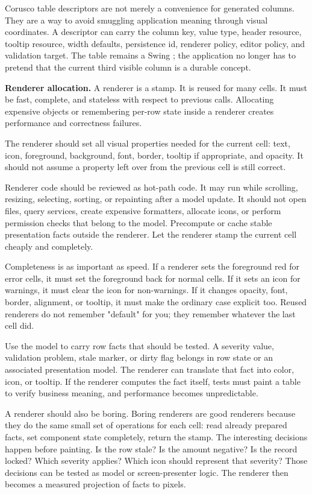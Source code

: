 Corusco table descriptors are not merely a convenience for generated columns.
They are a way to avoid smuggling application meaning through visual
coordinates. A descriptor can carry the column key, value type, header resource,
tooltip resource, width defaults, persistence id, renderer policy, editor
policy, and validation target. The table remains a Swing ; the
application no longer has to pretend that the current third visible column is a
durable concept.

\textbf{Renderer allocation.}
A renderer is a stamp. It is reused for many cells. It must be fast, complete, and stateless with respect to previous calls. Allocating expensive objects or remembering per-row state inside a renderer creates performance and correctness failures.

The renderer should set all visual properties needed for the current cell: text, icon, foreground, background, font, border, tooltip if appropriate, and opacity. It should not assume a property left over from the previous cell is still correct.

Renderer code should be reviewed as hot-path code. It may run while scrolling,
resizing, selecting, sorting, or repainting after a model update. It should not
open files, query services, create expensive formatters, allocate icons, or
perform permission checks that belong to the model. Precompute or cache stable
presentation facts outside the renderer. Let the renderer stamp the current
cell cheaply and completely.

Completeness is as important as speed. If a renderer sets the foreground red for
error cells, it must set the foreground back for normal cells. If it sets an
icon for warnings, it must clear the icon for non-warnings. If it changes
opacity, font, border, alignment, or tooltip, it must make the ordinary case
explicit too. Reused renderers do not remember "default" for you; they remember
whatever the last cell did.

Use the model to carry row facts that should be tested. A severity value,
validation problem, stale marker, or dirty flag belongs in row state or an
associated presentation model. The renderer can translate that fact into color,
icon, or tooltip. If the renderer computes the fact itself, tests must paint a
table to verify business meaning, and performance becomes unpredictable.

A renderer should also be boring. Boring renderers are good renderers because
they do the same small set of operations for each cell: read already prepared
facts, set component state completely, return the stamp. The interesting
decisions happen before painting. Is the row stale? Is the amount negative? Is
the record locked? Which severity applies? Which icon should represent that
severity? Those decisions can be tested as model or screen-presenter logic. The
renderer then becomes a measured projection of facts to pixels.

